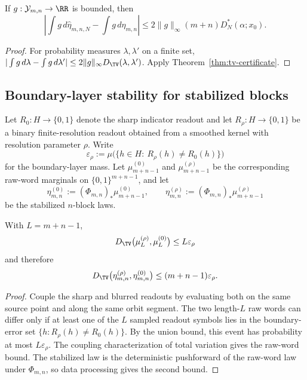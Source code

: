 \begin{corollary}\label{cor:observable-certificate}
If $g:\mathcal Y_{m,n}\to\RR$ is bounded, then
\[
\left|
\int g\,d\hat{\eta}_{m,n,N}-\int g\,d\eta_{m,n}
\right|
\le
2\|g\|_\infty (m+n)D_N^*(\alpha;x_0).
\]
\end{corollary}

\begin{proof}
For probability measures $\lambda,\lambda'$ on a finite set,
$|\int g\,d\lambda-\int g\,d\lambda'|
\le 2\|g\|_\infty D_{\TV}(\lambda,\lambda')$.  Apply
Theorem~\ref{thm:tv-certificate}.
\end{proof}

\subsection{Boundary-layer stability for stabilized blocks}\label{sec:fp:tv:boundary}

Let $R_0:H\to\{0,1\}$ denote the sharp indicator readout and let $R_\rho:H\to\{0,1\}$ be a binary finite-resolution readout obtained from a smoothed kernel with resolution parameter $\rho$. Write
\[
\varepsilon_\rho
:=
\mu\bigl(\{h\in H:\ R_\rho(h)\neq R_0(h)\}\bigr)
\]
for the boundary-layer mass. Let $\mu_{m+n-1}^{(0)}$ and $\mu_{m+n-1}^{(\rho)}$ be the corresponding raw-word marginals on $\{0,1\}^{m+n-1}$, and let
\[
\eta_{m,n}^{(0)}:=(\Phi_{m,n})_*\mu_{m+n-1}^{(0)},
\qquad
\eta_{m,n}^{(\rho)}:=(\Phi_{m,n})_*\mu_{m+n-1}^{(\rho)}
\]
be the stabilized $n$-block laws.

\begin{proposition}\label{prop:boundary-layer}
With $L=m+n-1$,
\[
D_{\TV}\bigl(\mu_L^{(\rho)},\mu_L^{(0)}\bigr)
\le L\varepsilon_\rho
\]
and therefore
\[
D_{\TV}\bigl(\eta_{m,n}^{(\rho)},\eta_{m,n}^{(0)}\bigr)
\le (m+n-1)\varepsilon_\rho .
\]
\end{proposition}

\begin{proof}
Couple the sharp and blurred readouts by evaluating both on the same source
point and along the same orbit segment.  The two length-$L$ raw words can
differ only if at least one of the $L$ sampled readout symbols lies in the
boundary-error set $\{h:R_\rho(h)\ne R_0(h)\}$.  By the union bound, this event
has probability at most $L\varepsilon_\rho$.  The coupling characterization of
total variation gives the raw-word bound.  The stabilized law is the
deterministic pushforward of the raw-word law under $\Phi_{m,n}$, so data
processing gives the second bound.
\end{proof}


